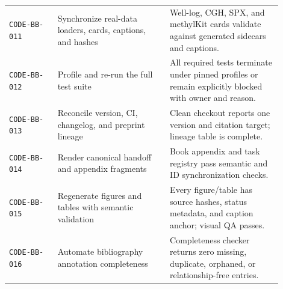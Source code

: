 \begin{longtable}{@{}p{0.16\linewidth}p{0.37\linewidth}p{0.37\linewidth}@{}}
\texttt{CODE-BB-011} & Synchronize real-data loaders, cards, captions, and hashes & Well-log, CGH, SPX, and methylKit cards validate against generated sidecars and captions. \\
\texttt{CODE-BB-012} & Profile and re-run the full test suite & All required tests terminate under pinned profiles or remain explicitly blocked with owner and reason. \\
\texttt{CODE-BB-013} & Reconcile version, CI, changelog, and preprint lineage & Clean checkout reports one version and citation target; lineage table is complete. \\
\texttt{CODE-BB-014} & Render canonical handoff and appendix fragments & Book appendix and task registry pass semantic and ID synchronization checks. \\
\texttt{CODE-BB-015} & Regenerate figures and tables with semantic validation & Every figure/table has source hashes, status metadata, and caption anchor; visual QA passes. \\
\texttt{CODE-BB-016} & Automate bibliography annotation completeness & Completeness checker returns zero missing, duplicate, orphaned, or relationship-free entries. \\
\bottomrule
\end{longtable}
\normalsize
